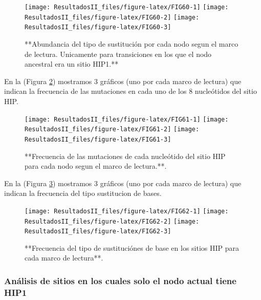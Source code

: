 \documentclass[
]{book}
\begin{document}
\begin{figure}

{\centering \texttt{[image: ResultadosII\_files/figure-latex/FIG60-1]} \texttt{[image: ResultadosII\_files/figure-latex/FIG60-2]} \texttt{[image: ResultadosII\_files/figure-latex/FIG60-3]} 

}

\caption{**Abundancia del tipo de sustitución por cada nodo segun el marco de lectura. Unicamente para transiciones en los que el nodo ancestral era un sitio HIP1.**}\label{fig:FIG60}
\end{figure}

En la (Figura \ref{fig:FIG61}) mostramos 3 gráficos (uno por cada marco de lectura) que indican la frecuencia de las mutaciones en cada uno de los 8 nucleótidos del sitio HIP.

\begin{figure}

{\centering \texttt{[image: ResultadosII\_files/figure-latex/FIG61-1]} \texttt{[image: ResultadosII\_files/figure-latex/FIG61-2]} \texttt{[image: ResultadosII\_files/figure-latex/FIG61-3]} 

}

\caption{**Frecuencia de las mutaciones de cada nucleótido del sitio HIP para cada nodo segun el marco de lectura.**.}\label{fig:FIG61}
\end{figure}

En la (Figura \ref{fig:FIG62}) mostramos 3 gráficos (uno por cada marco de lectura) que indican la frecuencia del tipo sustitucion de bases.

\begin{figure}

{\centering \texttt{[image: ResultadosII\_files/figure-latex/FIG62-1]} \texttt{[image: ResultadosII\_files/figure-latex/FIG62-2]} \texttt{[image: ResultadosII\_files/figure-latex/FIG62-3]} 

}

\caption{**Frecuencia del tipo de sustituciónes de base en los sitios HIP para cada marco de lectura**.}\label{fig:FIG62}
\end{figure}

\hypertarget{anuxe1lisis-de-sitios-en-los-cuales-solo-el-nodo-actual-tiene-hip1-2}{%
\subsubsection{Análisis de sitios en los cuales solo el nodo actual tiene HIP1}\label{anuxe1lisis-de-sitios-en-los-cuales-solo-el-nodo-actual-tiene-hip1-2}}
\end{document}
